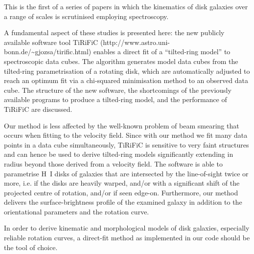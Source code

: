 \documentclass[oldversion]{aa}
\newcommand{\cng}[1]{{#1}}
\begin{document}
  \abstract
%
   {This is the first of a series of papers in which the kinematics of disk galaxies over a range of scales is scrutinised employing spectroscopy.

 A fundamental aspect of these studies is
   presented here:  the new publicly available software tool
%
%
   TiRiFiC
   (http://www.astro.uni-bonn.de/{\~{}}gjozsa/tirific.html) enables a
   direct fit of a ``tilted-ring model'' to spectroscopic data cubes. 
%
%
   The algorithm generates model data cubes from the tilted-ring
   parametrisation of a rotating disk, which are automatically
   adjusted to reach an optimum fit  
   via a chi-squared minimisation method to an observed data cube. The structure of the new
   software, the shortcomings of the \cng{previously} available
   programs to produce a tilted-ring model, and the performance of TiRiFiC are discussed.
%
%

   Our method is \cng{less} affected by the well-known problem of
   beam smearing that occurs when fitting to the velocity field. \cng{Since with our method we fit many data points in a data cube simultaneously, TiRiFiC is sensitive to very faint structures and can hence be used to derive tilted-ring models significantly extending \cng{in radius beyond} those derived from a velocity field.}
  The software is able to parametrise {H\,{\small
   I}} disks of galaxies that are intersected by the
   line-of-sight twice or more, i.e. if the disks are heavily warped\cng{, and/or with a significant shift of the projected centre of rotation, and/or if} seen
   edge-on. Furthermore, our method delivers the surface-brightness
   profile of the examined galaxy in addition to the orientational
   parameters and the rotation curve.
%
%

   In order to derive kinematic and morphological models of disk
   galaxies, especially reliable rotation curves, a direct-fit method
   as implemented in our code should be \cng{the tool of choice}.}


   \maketitle %
% 
\end{document}
